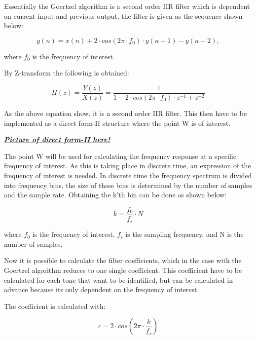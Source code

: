 		Essentially the Goertzel algorithm is a second order IIR filter which is dependent on current input and previous
		output, the filter is given as the sequence shown below:
		\begin{center}\begin{equation}y(n) = x(n) + 2\cdot cos(2\pi \cdot f_{0})\cdot y(n - 1) - y(n - 2),\end{equation}\end{center}
		where $f_{0}$ is the frequency of interest.
		
		By Z-transform the following is obtained:
		\begin{center}\begin{equation}H(z) = \frac{Y(z)}{X(z)} = \frac{1}{1 - 2\cdot cos(2\pi \cdot f_{0})\cdot z^{-1} + z^{-2}}\end{equation}\end{center}
		
		As the above equation show, it is a second order IIR filter. This then have to be implemented as a direct form-II structure
		where the point W is of interest.
		
		\textbf{\textit{\underline{Picture of direct form-II here!}}}
		
		The point W will be used for calculating the frequency response at a specific frequency of interest. As this is taking
		place in discrete time, an expression of the frequency of interest is needed. In discrete time the frequency spectrum
		is divided into frequency bins, the size of these bins is determined by the number of samples and the sample rate.
		Obtaining the k'th bin can be done as shown below:
		\begin{center}\begin{equation}k = \frac{f_{0}}{f_{s}}\cdot N\end{equation}\end{center}
		where $f_{0}$ is the frequency of interest, $f_{s}$ is the sampling frequency, and N is the number of samples.
		
		Now it is possible to calculate the filter coefficients, which in the case with the Goertzel algorithm reduces 
		to one single coefficient. This coefficient have to be calculated for each tone that want to be identified, but can 
		be calculated in advance because its only dependent on the frequency of interest.
		
		The coefficient is calculated with:
		\begin{center}\begin{equation}c = 2\cdot cos(2\pi \cdot \frac{k}{f_{s}})\end{equation}\end{center}
		
